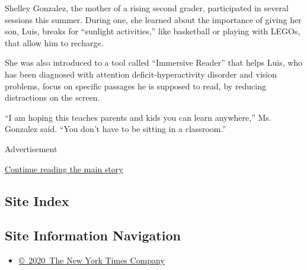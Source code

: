 Shelley Gonzalez, the mother of a rising second grader, participated in
several sessions this summer. During one, she learned about the
importance of giving her son, Luis, breaks for ``sunlight activities,''
like basketball or playing with LEGOs, that allow him to recharge.

She was also introduced to a tool called ``Immersive Reader'' that helps
Luis, who has been diagnosed with attention deficit-hyperactivity
disorder and vision problems, focus on specific passages he is supposed
to read, by reducing distractions on the screen.

``I am hoping this teaches parents and kids you can learn anywhere,''
Ms. Gonzalez said. ``You don't have to be sitting in a classroom.''

Advertisement

\protect\hyperlink{after-bottom}{Continue reading the main story}

\hypertarget{site-index}{%
\subsection{Site Index}\label{site-index}}

\hypertarget{site-information-navigation}{%
\subsection{Site Information
Navigation}\label{site-information-navigation}}

\begin{itemize}
\tightlist
\item
  \href{https://help.nytimes3xbfgragh.onion/hc/en-us/articles/115014792127-Copyright-notice}{©~2020~The
  New York Times Company}
\end{itemize}

